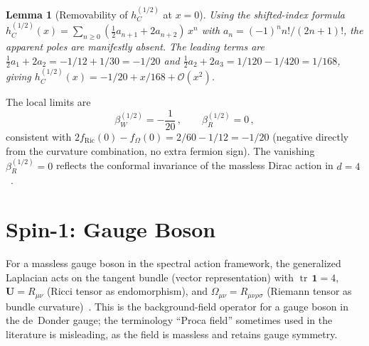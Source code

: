 \documentclass[aps,prd,twocolumn,superscriptaddress,nofootinbib,floatfix]{revtex4-2}
\newtheorem{lemma}[theorem]{Lemma}
\theoremstyle{definition}
\theoremstyle{remark}
\newcommand{\tr}{\operatorname{tr}}
\begin{document}
\begin{lemma}[Removability of $h_C^{(1/2)}$ at $x = 0$]
\label{lem:pole-dirac}
Using the shifted-index formula
$h_C^{(1/2)}(x) = \sum_{n \geq 0}(\tfrac{1}{2}a_{n+1} + 2a_{n+2})\,x^n$
with $a_n = (-1)^n n!/(2n+1)!$, the apparent poles are manifestly absent.
The leading terms are $\tfrac{1}{2}a_1 + 2a_2 = -1/12 + 1/30 = -1/20$
and $\tfrac{1}{2}a_2 + 2a_3 = 1/120 - 1/420 = 1/168$, giving
$h_C^{(1/2)}(x) = -1/20 + x/168 + \mathcal{O}(x^2)$.
\end{lemma}

The local limits are
\begin{equation}
  \beta_W^{(1/2)} = -\frac{1}{20}\,,\qquad
  \beta_R^{(1/2)} = 0\,,
  \label{eq:beta-dirac}
\end{equation}
consistent with
$2f_{\text{Ric}}(0) - f_\Omega(0) = 2/60 - 1/12 = -1/20$
(negative directly from the curvature combination, no extra fermion sign).
The vanishing $\beta_R^{(1/2)} = 0$ reflects the conformal invariance of the
massless Dirac action in $d = 4$~\cite{Parker:2009uva,Codello:2008vh}.


\section{Spin-1: Gauge Boson}
\label{sec:vector}

For a massless gauge boson in the spectral action framework, the
generalized Laplacian acts on the tangent bundle (vector representation) with
$\tr\,\mathbf{1} = 4$, $\mathbf{U} = R_{\mu\nu}$ (Ricci tensor as
endomorphism), and $\Omega_{\mu\nu} = R_{\mu\nu\rho\sigma}$ (Riemann tensor as
bundle curvature)~\cite{Parker:2009uva,Vassilevich:2003xt}. This is the
background-field operator for a gauge boson in the de~Donder gauge; the
terminology ``Proca field'' sometimes used in the literature is misleading, as
the field is massless and retains gauge symmetry.
\end{document}
